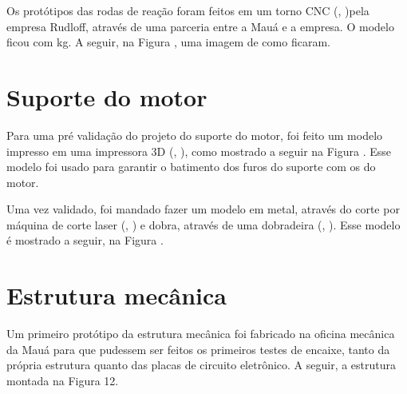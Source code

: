 \documentclass[
	12pt,				%
	openany,			%
	twoside,			%
	a4paper,			%
	english,			%
	french,				%
	spanish,			%
	brazil,				%
	oldfontcommands
	]{abntex2}
\begin{document}
Os protótipos das rodas de reação foram feitos em um torno CNC (, )pela empresa Rudloff, através de uma parceria entre a Mauá e a empresa. O modelo ficou com  kg. A seguir, na Figura , uma imagem de como ficaram.

%	

\section{Suporte do motor}

Para uma pré validação do projeto do suporte do motor, foi feito um modelo impresso em uma impressora 3D (, ), como mostrado a seguir na Figura . Esse modelo foi usado para garantir o batimento dos furos do suporte com os do motor.

%	

Uma vez validado, foi mandado fazer um modelo em metal, através do corte por máquina de corte laser (, ) e dobra, através de uma dobradeira (, ). Esse modelo é mostrado a seguir, na Figura .

%	

\section{Estrutura mecânica}

Um primeiro protótipo da estrutura mecânica foi fabricado na oficina mecânica da Mauá para que pudessem ser feitos os primeiros testes de encaixe, tanto da própria estrutura quanto das placas de circuito eletrônico. A seguir, a estrutura montada na Figura 12.
\end{document}
